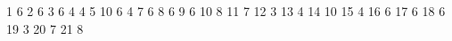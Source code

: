1  6
2  6
3  6
4  4
5  10
6  4
7  6
8  6
9  6
10 8
11 7
12 3
13 4
14 10
15 4
16 6
17 6
18 6
19 3 
20 7 
21 8
